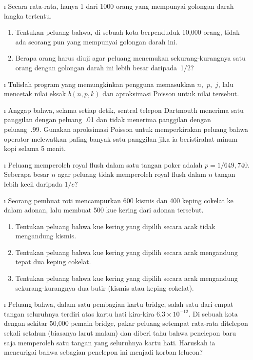 \begin{LJSItem}
\i\label{exer 5.1.109} Secara rata-rata, hanya 1 dari 1000 orang yang mempunyai
golongan darah langka tertentu.

\begin{enumerate}
\item Tentukan peluang bahwa, di sebuah kota berpenduduk 10{,}000 orang, tidak ada
seorang pun yang mempunyai golongan darah ini.

\item Berapa orang harus diuji agar peluang menemukan sekurang-kurangnya satu orang
dengan golongan darah ini lebih besar daripada~1/2?
\end{enumerate}

\i\label{exer 5.1.110} Tulislah program yang memungkinkan pengguna memasukkan
$n$,~$p$,~$j$, lalu mencetak nilai eksak $b(n, p, k)$ dan aproksimasi Poisson untuk
nilai tersebut.

\i\label{exer 5.1.111} Anggap bahwa, selama setiap detik, sentral telepon Dartmouth
menerima satu panggilan dengan peluang~.01 dan tidak menerima panggilan dengan
peluang~.99. Gunakan aproksimasi Poisson untuk memperkirakan peluang bahwa operator
melewatkan paling banyak satu panggilan jika ia beristirahat minum kopi selama 5 menit.

\i\label{exer 5.1.112} Peluang memperoleh royal flush dalam satu tangan poker adalah
$p = 1/649{,}740$. Seberapa besar $n$ agar peluang tidak memperoleh royal flush dalam
$n$ tangan lebih kecil daripada $1/e$?

\i\label{exer 5.1.113} Seorang pembuat roti mencampurkan 600 kismis dan 400 keping
cokelat ke dalam adonan, lalu membuat 500 kue kering dari adonan tersebut.
\begin{enumerate}
\item Tentukan peluang bahwa kue kering yang dipilih secara acak tidak mengandung
kismis.

\item Tentukan peluang bahwa kue kering yang dipilih secara acak mengandung tepat dua
keping cokelat.

\item Tentukan peluang bahwa kue kering yang dipilih secara acak mengandung
sekurang-kurangnya dua butir (kismis atau keping cokelat).
\end{enumerate}

\i\label{exer 5.1.114} Peluang bahwa, dalam satu pembagian kartu bridge,
salah satu dari empat tangan seluruhnya terdiri atas kartu hati kira-kira
$6.3 \times 10^{-12}$. Di sebuah kota dengan sekitar 50{,}000 pemain bridge, pakar
peluang setempat rata-rata ditelepon sekali setahun (biasanya larut malam) dan diberi
tahu bahwa penelepon baru saja memperoleh satu tangan yang seluruhnya kartu hati.
Haruskah ia mencurigai bahwa sebagian penelepon ini menjadi korban lelucon?


\end{LJSItem}
